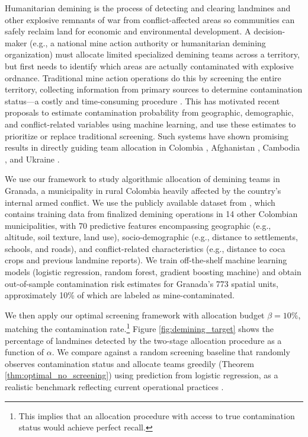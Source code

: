 Humanitarian demining is the process of detecting and clearing landmines and other explosive remnants of war from conflict-affected areas so communities can safely reclaim land for economic and environmental development. A decision-maker (e.g., a national mine action authority or humanitarian demining organization) must allocate limited specialized demining teams across a territory, but first needs to identify which areas are actually contaminated with explosive ordnance. Traditional mine action operations do this by screening the entire territory, collecting information from primary sources to determine contamination status---a costly and time-consuming procedure \cite{}. This has motivated recent proposals to estimate contamination probability from geographic, demographic, and conflict-related variables using machine learning, and use these estimates to prioritize or replace traditional screening. Such systems have shown promising results in directly guiding team allocation in Colombia \cite{dulce2024reland}, Afghanistan \cite{collins28advancements}, Cambodia \cite{cirillo2024desk}, and Ukraine \cite{grit}.

We use our framework to study algorithmic allocation of demining teams in Granada, a municipality in rural Colombia heavily affected by the country's internal armed conflict. We use the publicly available dataset from \cite{dulce2024reland}, which contains training data from finalized demining operations in 14 other Colombian municipalities, with 70 predictive features encompassing geographic (e.g., altitude, soil texture, land use), socio-demographic (e.g., distance to settlements, schools, and roads), and conflict-related characteristics (e.g., distance to coca crops and previous landmine reports). We train off-the-shelf machine learning models (logistic regression, random forest, gradient boosting machine) and obtain out-of-sample contamination risk estimates for Granada's 773 spatial units, approximately 10\% of which are labeled as mine-contaminated.

We then apply our optimal screening framework with allocation budget $\beta = 10\%$, matching the contamination rate.\footnote{This implies that an allocation procedure with access to true contamination status would achieve perfect recall.} Figure \ref{fig:demining_target} shows the percentage of landmines detected by the two-stage allocation procedure as a function of $\alpha$. We compare against a random screening baseline that randomly observes contamination status and allocate teams greedily (Theorem \ref{thm:optimal_no_screening}) using prediction from logistic regression, as a realistic benchmark reflecting current operational practices \cite{dulce2024reland}.

